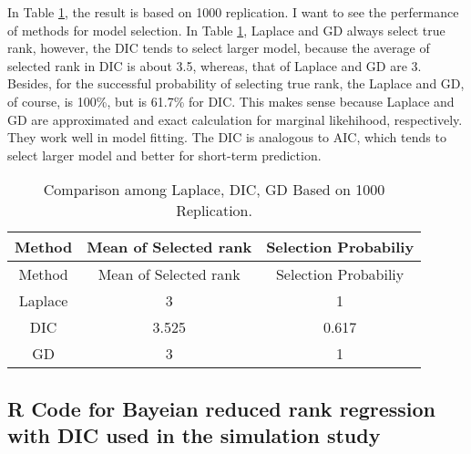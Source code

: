 \documentclass[]{book}
\begin{document}
In Table \ref{tab:table2}, the result is based on 1000 replication. I want to see the perfermance of methods for model selection. In
Table \ref{tab:table2}, Laplace and GD always select true rank, however, the DIC tends to select larger model, because the average of
selected rank in DIC is about 3.5, whereas, that of Laplace and GD are 3. Besides, for the successful probability of selecting true
rank, the Laplace and GD, of course, is 100\%, but is 61.7\% for DIC. This makes sense because Laplace and GD are approximated and exact calculation for marginal likehihood, respectively. They work well in model fitting. The DIC is analogous to AIC, which tends to select larger model and better for short-term prediction.

\begin{longtable}[]{@{}ccc@{}}
\caption{\label{tab:table2} Comparison among Laplace, DIC, GD Based on 1000 Replication.}\tabularnewline
\toprule
Method & Mean of Selected rank & Selection Probabiliy\tabularnewline
\midrule
\endfirsthead
\toprule
Method & Mean of Selected rank & Selection Probabiliy\tabularnewline
\midrule
\endhead
Laplace & 3 & 1\tabularnewline
DIC & 3.525 & 0.617\tabularnewline
GD & 3 & 1\tabularnewline
\bottomrule
\end{longtable}

\hypertarget{r-code-for-bayeian-reduced-rank-regression-with-dic-used-in-the-simulation-study}{%
\subsection{R Code for Bayeian reduced rank regression with DIC used in the simulation study}\label{r-code-for-bayeian-reduced-rank-regression-with-dic-used-in-the-simulation-study}}
\end{document}
